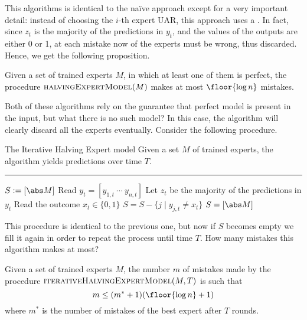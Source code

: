 \documentclass[a4paper, 12pt]{report}
\begin{document}
    This algorithms is identical to the naïve approach except for a very important detail: instead of choosing the $i$-th expert UAR, this approach uses a . In fact, since $z_t$ is the majority of the predictions in $y_t$, and the values of the outputs are either 0 or 1, at each mistake now  of the experts must be wrong, thus discarded. Hence, we get the following proposition.

    \begin{framedprop}{}
        Given a set of trained experts $M$, in which at least one of them is perfect, the procedure $\textsc{halvingExpertModel}(M)$ makes at most $\floor{\log n}$ mistakes.
    \end{framedprop}

    Both of these algorithms rely on the guarantee that  perfect model is present in the input, but what there is no such model? In this case, the algorithm will clearly discard all the experts eventually. Consider the following procedure.

    \begin{framedalgo}{The Iterative Halving Expert model}
        Given a set $M$ of trained experts, the algorithm yields predictions over time $T$. \\
        \hrule

        \quad
        \begin{algorithmic}[1]
                \State $S := [\abs M]$
                    \State Read $y_t = [y_{1, t} \ \cdots \ y_{n, t}]$
                    \State Let $z_t$ be the majority of the predictions in $y_t$
                    \State Read the outcome $x_t \in \{0, 1\}$
                        \State $S = S - \{j \mid y_{j, t} \neq x_t\}$
                         
                            \State $S = [\abs M]$
                        \EndIf
                    \EndIf
                \EndFor
            \EndFunction
        \end{algorithmic}
    \end{framedalgo}

    This procedure is identical to the previous one, but now if $S$ becomes empty we fill it again in order to repeat the process until time $T$. How many mistakes this algorithm makes at most?

    \begin{framedthm}{}
        Given a set of trained experts $M$, the number $m$ of mistakes made by the procedure $\textsc{iterativeHalvingExpertModel}(M, T)$ is such that $$m \le (m^* + 1)(\floor{\log n} + 1)$$ where $m^*$ is the number of mistakes of the best expert after $T$ rounds.
    \end{framedthm}
    
\end{document}
